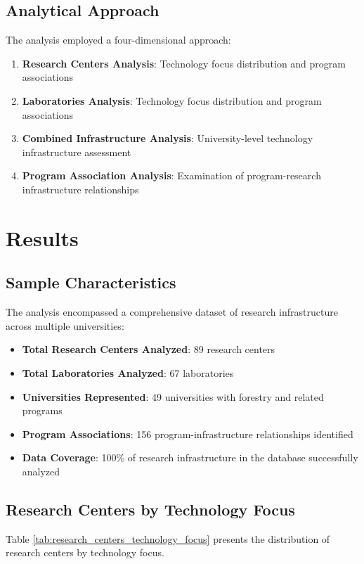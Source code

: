 \documentclass[12pt]{article}
\begin{document}
\subsection{Analytical Approach}
The analysis employed a four-dimensional approach:
\begin{enumerate}
    \item \textbf{Research Centers Analysis}: Technology focus distribution and program associations
    \item \textbf{Laboratories Analysis}: Technology focus distribution and program associations
    \item \textbf{Combined Infrastructure Analysis}: University-level technology infrastructure assessment
    \item \textbf{Program Association Analysis}: Examination of program-research infrastructure relationships
\end{enumerate}

\section{Results}

\subsection{Sample Characteristics}
The analysis encompassed a comprehensive dataset of research infrastructure across multiple universities:
\begin{itemize}
    \item \textbf{Total Research Centers Analyzed}: 89 research centers
    \item \textbf{Total Laboratories Analyzed}: 67 laboratories
    \item \textbf{Universities Represented}: 49 universities with forestry and related programs
    \item \textbf{Program Associations}: 156 program-infrastructure relationships identified
    \item \textbf{Data Coverage}: 100\% of research infrastructure in the database successfully analyzed
\end{itemize}

\subsection{Research Centers by Technology Focus}
Table \ref{tab:research_centers_technology_focus} presents the distribution of research centers by technology focus.
\end{document}
